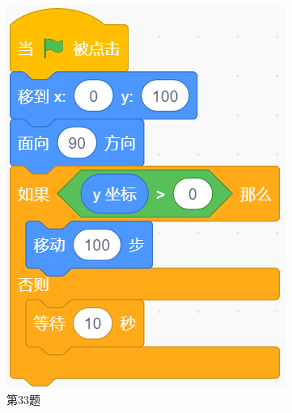 \documentclass[10pt, a4paper]{article}
\begin{document}
\begin{enumerate}
\begin{figure}[htbp]
\begin{minipage}[t]{.14\textwidth}
                \includegraphics[width=\textwidth]{33.png}
                \caption*{第33题}
            \end{minipage}
            \begin{minipage}[t]{.16\textwidth}
                \centering

\end{minipage}
\end{figure}
\end{enumerate}
\end{document}
